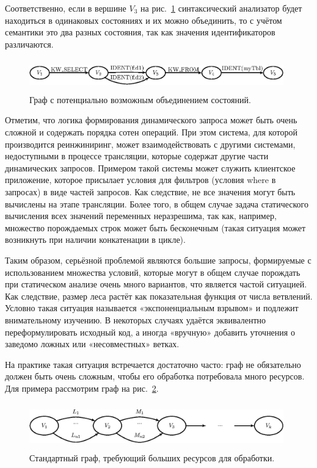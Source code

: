 \documentclass{llncs}
\begin{document}
Соответственно, если в вершине $V_3$ на рис.~\ref{pic4} синтаксический анализатор будет находиться в одинаковых состояниях и их можно объединить, то с учётом семантики это два разных состояния, так как значения идентификаторов различаются.


\begin{figure}
    \begin{center}
        \includegraphics[width=11cm,height=1.4cm]{graphs/states_example.eps}
        \caption{Граф с потенциально возможным объединением состояний.}
        \label{pic4}
    \end{center}
\end{figure}

Отметим, что логика формирования динамического запроса может быть очень сложной и содержать порядка сотен операций. При этом система, для которой производится реинжиниринг, может взаимодействовать с другими системами, недоступными в процессе трансляции, которые содержат другие части динамических запросов. Примером такой системы может служить клиентское приложение, которое присылает условия для фильтров (условия where в запросах) в виде частей запросов. Как следствие, не все значения могут быть вычислены на этапе трансляции. Более того, в общем случае задача статического вычисления всех значений переменных неразрешима, так как, например, множество порождаемых строк может быть бесконечным (такая ситуация может возникнуть при наличии конкатенации в цикле).

Таким образом, серьёзной проблемой являются большие запросы, формируемые с использованием множества условий, которые могут в общем случае порождать при статическом анализе очень много вариантов, что является частой ситуацией. Как следствие, размер леса растёт как показательная функция от числа ветвлений. Условно такая ситуация называется «экспоненциальным взрывом» и подлежит внимательному изучению. В некоторых случаях удаётся эквивалентно переформулировать исходный код, а иногда «вручную» добавить уточнения о заведомо ложных или «несовместных» ветках.

На практике такая ситуация встречается достаточно часто: граф не обязательно должен быть очень сложным, чтобы его обработка потребовала много ресурсов. Для примера рассмотрим граф  на рис.~\ref{pic5}.

\begin{figure}
    \begin{center}
        \includegraphics[width=11cm,height=2cm]{graphs/big_res.eps}
        \caption{Стандартный граф, требующий больших ресурсов для обработки.}
        \label{pic5}
    \end{center}
\end{figure}
\end{document}
